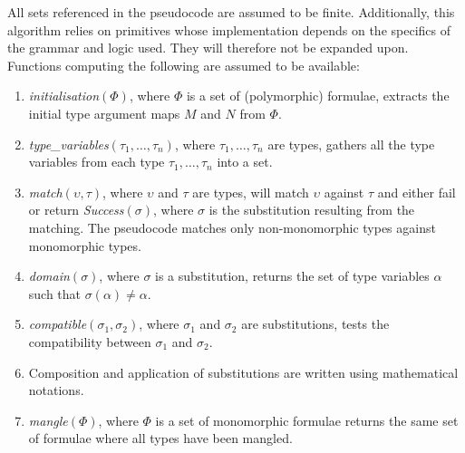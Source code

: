 \documentclass[runningheads]{llncs}
\begin{document}
All sets referenced in the pseudocode are assumed to be finite. Additionally, this algorithm relies on primitives whose implementation depends on the specifics of the grammar and logic used. They will therefore not be expanded upon. Functions computing the following are assumed to be available: 
\begin{enumerate}
   \item[\labelitemi] \emph{initialisation\((\Phi)\)}, where \(\Phi\) is a set of (polymorphic) formulae, extracts the initial type argument maps \(M\) and \(N\) from \(\Phi\).
   \item[\labelitemi] \emph{type\_variables\((\tau_1, \dots, \tau_n)\)}, where \(\tau_1, \dots,\tau_n\) are types, gathers all the type variables from each type \(\tau_1, \dots, \tau_n\) into a set.
   \item[\labelitemi] \emph{match\((\upsilon, \tau)\)}, where \(\upsilon\) and \(\tau\) are types, will match \(\upsilon\) against \(\tau\) and either fail or return \emph{Success\((\sigma)\)}, where \(\sigma\) is the substitution resulting from the matching. The pseudocode matches only non-monomorphic types against monomorphic types.
   \item[\labelitemi] \emph{domain\((\sigma)\)}, where \(\sigma\) is a substitution, returns the set of type variables \(\alpha\) such that \(\sigma(
   \alpha) \not= \alpha\).
   \item[\labelitemi] \emph{compatible\((\sigma_1, \sigma_2)\)}, where \(\sigma_1\) and \(\sigma_2\) are substitutions, tests the compatibility between \(\sigma_1\) and \(\sigma_2\).
   \item[\labelitemi] Composition and application of substitutions are written using mathematical notations.
   \item[\labelitemi] \emph{mangle\((\Phi)\)}, where \(\Phi\) is a set of monomorphic formulae returns the same set of formulae where all types have been mangled.
\end{enumerate}
\end{document}
